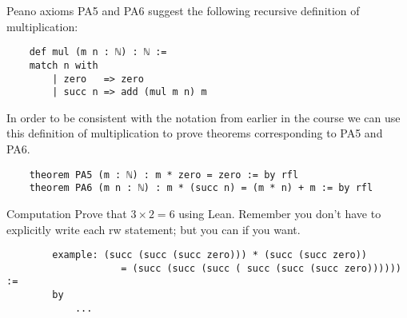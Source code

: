 \documentclass{book}
\begin{document}
Peano axioms PA5 and PA6 suggest the following recursive definition of multiplication:

\begin{center}
    \begin{lstlisting}
    def mul (m n : ℕ) : ℕ :=
    match n with
        | zero   => zero
        | succ n => add (mul m n) m
    \end{lstlisting}
\end{center}

In order to be consistent with the notation from earlier in the course we can use this definition of multiplication to prove theorems corresponding to PA5 and PA6. 

\begin{center}
    \begin{lstlisting}
    theorem PA5 (m : ℕ) : m * zero = zero := by rfl
    theorem PA6 (m n : ℕ) : m * (succ n) = (m * n) + m := by rfl
    \end{lstlisting}
\end{center}

\begin{eg}{Computation}
    Prove that $3 \times 2 = 6$ using Lean. Remember you don't have to explicitly write each rw statement; but you can if you want. 
    \begin{lstlisting}
        example: (succ (succ (succ zero))) * (succ (succ zero)) 
                    = (succ (succ (succ ( succ (succ (succ zero)))))) :=
        by
            ...
    \end{lstlisting}
\end{eg}
\end{document}
